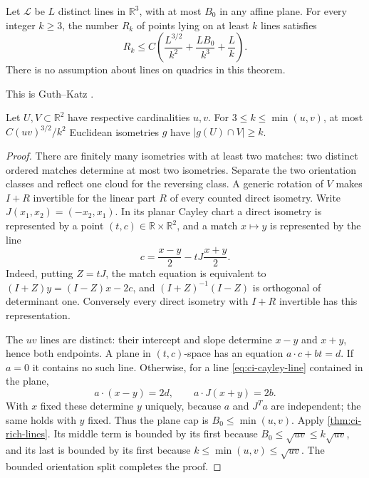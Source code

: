 \begin{theorem}\label{thm:ci-rich-lines}
Let $\mathcal{L}$ be $L$ distinct lines in $\mathbb{R}^3$, with at most $B_0$ in any affine plane.  For every integer $k\ge3$, the number $R_k$ of points lying on at least $k$ lines satisfies
\[
 R_k\le C\left(\frac{L^{3/2}}{k^2}
             +\frac{LB_0}{k^3}+\frac Lk\right).
\]
There is no assumption about lines on quadrics in this theorem.
\end{theorem}

This is Guth--Katz \cite[Theorem~4.5]{guthkatz2015}.

\begin{corollary}\label{cor:ci-planar-motions}
Let $U,V\subset\mathbb{R}^2$ have respective cardinalities $u,v$. For $3\le k\le\min(u,v)$, at most $C(uv)^{3/2}/k^2$ Euclidean isometries $g$ have $|g(U)\cap V|\ge k$.
\end{corollary}

\begin{proof}
There are finitely many isometries with at least two matches: two distinct ordered matches determine at most two isometries.  Separate the two orientation classes and reflect one cloud for the reversing class.  A generic rotation of $V$ makes $I+R$ invertible for the linear part $R$ of every counted direct isometry.  Write $J(x_1,x_2)=(-x_2,x_1)$.  In its planar Cayley chart a direct isometry is represented by a point $(t,c)\in\mathbb{R}\times\mathbb{R}^2$, and a match $x\mapsto y$ is represented by the line
\begin{equation}\label{eq:ci-cayley-line}
 c=\frac{x-y}{2}-tJ\frac{x+y}{2}.
\end{equation}
Indeed, putting $Z=tJ$, the match equation is equivalent to $(I+Z)y=(I-Z)x-2c$, and $(I+Z)^{-1}(I-Z)$ is orthogonal of determinant one.  Conversely every direct isometry with $I+R$ invertible has this representation.

The $uv$ lines are distinct: their intercept and slope determine $x-y$ and $x+y$, hence both endpoints.  A plane in $(t,c)$-space has an equation $a\cdot c+bt=d$.  If $a=0$ it contains no such line.  Otherwise, for a line \eqref{eq:ci-cayley-line} contained in the plane,
\[
 a\cdot(x-y)=2d,\qquad a\cdot J(x+y)=2b.
\]
With $x$ fixed these determine $y$ uniquely, because $a$ and $J^Ta$ are independent; the same holds with $y$ fixed.  Thus the plane cap is $B_0\le\min(u,v)$.  Apply \cref{thm:ci-rich-lines}.  Its middle term is bounded by its first because $B_0\le\sqrt{uv}\le k\sqrt{uv}$, and its last is bounded by its first because $k\le\min(u,v)\le\sqrt{uv}$. The bounded orientation split completes the proof.
\end{proof}

